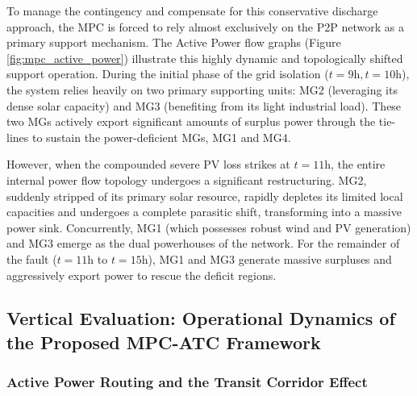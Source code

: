 \begin{itemize}
To manage the contingency and compensate for this conservative discharge approach, the MPC is forced to rely almost exclusively on the P2P network as a primary support mechanism. The Active Power flow graphs (Figure \ref{fig:mpc_active_power}) illustrate this highly dynamic and topologically shifted support operation. During the initial phase of the grid isolation ($t=9\text{h}, t=10\text{h}$), the system relies heavily on two primary supporting units: MG2 (leveraging its dense solar capacity) and MG3 (benefiting from its light industrial load). These two MGs actively export significant amounts of surplus power through the tie-lines to sustain the power-deficient MGs, MG1 and MG4. 

However, when the compounded severe PV loss strikes at $t=11\text{h}$, the entire internal power flow topology undergoes a significant restructuring. MG2, suddenly stripped of its primary solar resource, rapidly depletes its limited local capacities and undergoes a complete parasitic shift, transforming into a massive power sink. Concurrently, MG1 (which possesses robust wind and PV generation) and MG3 emerge as the dual powerhouses of the network. For the remainder of the fault ($t=11\text{h}$ to $t=15\text{h}$), MG1 and MG3 generate massive surpluses and aggressively export power to rescue the deficit regions. 
\end{itemize}

\subsection{Vertical Evaluation: Operational Dynamics of the Proposed MPC-ATC Framework}

\subsubsection{Active Power Routing and the Transit Corridor Effect}

